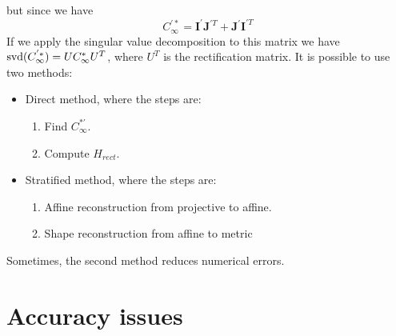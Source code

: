 \documentclass[12pt, a4paper]{report}
\begin{document}
\begin{itemize}
\begin{enumerate}
                    but since we have 
                    \[C_{\infty}^{'*}=\boldsymbol{I}^{'}\boldsymbol{J}^{'T}+\boldsymbol{J}^{'}\boldsymbol{I}^{'T}\]
                    If we apply the singular value decomposition to this matrix we have $\textnormal{svd}(C_{\infty}^{'*})=UC_{\infty}^{*}U^T$, where 
                    $U^T$ is the rectification matrix. It is possible to use two methods: 
                    \begin{itemize}
                        \item Direct method, where the steps are: 
                            \begin{enumerate}
                                \item Find $C_{\infty}^{*'}$. 
                                \item Compute $H_{rect}$. 
                            \end{enumerate}
                        \item Stratified method, where the steps are: 
                            \begin{enumerate}
                                \item Affine reconstruction from projective to affine. 
                                \item Shape reconstruction from affine to metric
                            \end{enumerate}
                    \end{itemize}
                    Sometimes, the second method reduces numerical errors. 
            \end{enumerate}
    \end{itemize}

    \section{Accuracy issues}
\end{document}
